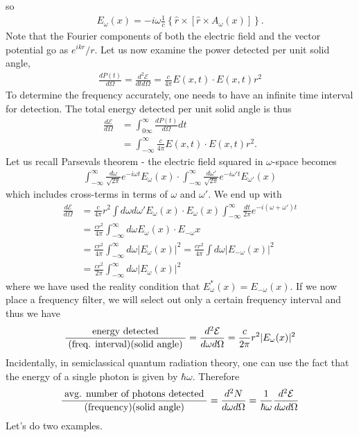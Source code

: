 so
\begin{align*}
    E_\omega(x)=-i\omega \frac{1}{c}\left\{ \hat{r}\times\left[ \hat{r}\times A_\omega(x) \right] \right\}.
\end{align*}
Note  that the Fourier components of both the electric field and the vector potential go as $e^{ikr}/r$. Let us now examine the power detected per unit
solid angle,
\begin{align*}
    \frac{dP(t)}{d\Omega}=\frac{d^2\mathcal{E}}{dt d\Omega}=\frac{c}{4\pi}E(x,t)\cdot E(x,t) r^2
\end{align*}
To determine the frequency accurately, one needs to have an infinite time interval for detection. The total energy detected per unit solid angle is thus
\begin{align*}
    \frac{d\mathcal{E}}{d\Omega}&=\int_{0\infty}^\infty \frac{dP(t)}{d\Omega}dt\\
    &=\int_{-\infty}^\infty \frac{c}{4\pi}E(x,t)\cdot E(x,t) r^2.
\end{align*}
Let us recall Parsevals theorem - the electric field squared in $\omega$-space becomes
\begin{align*}
    \int_{-\infty}^\infty \frac{d\omega}{\sqrt{2\pi}}e^{-i\omega t}E_\omega(x) \cdot \int_{-\infty}^\infty \frac{d\omega'}{\sqrt{2\pi}}e^{-i\omega' t}E_{\omega'}(x)
\end{align*}
which includes cross-terms in terms of $\omega$ and $\omega'$. We end up with
\begin{align*}
    \frac{d\mathcal{E}}{d\Omega}&=\frac{c}{4\pi}r^2\int d\omega d\omega' E_\omega(x) \cdot E_{\omega}(x) \int_{-\infty}^\infty \frac{dt}{2\pi} e^{-i(\omega+\omega')t}\\
    &=\frac{cr^2}{4\pi}\int_{-\infty}^\infty d\omega E_\omega(x)\cdot E_{-\omega}{x}\\
    &=\frac{cr^2}{4\pi}\int_{-\infty}^\infty d\omega |E_\omega(x)|^2=\frac{cr^2}{4\pi}\int d\omega |E_{-\omega}(x)|^2\\
    &=\frac{cr^2}{2\pi}\int_{-\infty}^\infty  d\omega |E_\omega(x)|^2
\end{align*}
where we have used the reality condition that $E_\omega^*(x)=E_{-\omega}(x)$. If we now place a frequency filter, we will select out only a certain frequency
interval and thus we have
\begin{align*}
    \frac{\;\textnormal{energy detected}\;}{\;\textnormal{(freq. interval)(solid angle)}\;}=\frac{d^2\mathcal{E}}{d\omega d\Omega}=\frac{c}{2\pi}r^2|E_\omega(x)|^2
\end{align*}
Incidentally, in semiclassical quantum radiation theory, one can use the fact that the energy of a single photon is given by $\hbar \omega$. Therefore
\begin{align*}
    \frac{\;\textnormal{avg. number of photons detected}\;}{\;\textnormal{(frequency)(solid angle)}\;}=\frac{d^2N}{d\omega d\Omega}=\frac{1}{\hbar\omega}\frac{d^2\mathcal{E}}{d\omega d\Omega}
\end{align*}
Let's do two examples.

